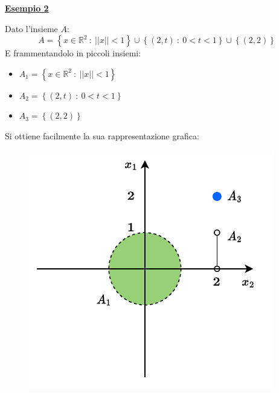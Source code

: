 \documentclass[a4paper]{article}
\newcommand{\example}[1]{\textcolor{Green4}{\textbf{#1}}}
\begin{document}
	\begin{flushleft}
		\example{\underline{Esempio 2}}
	\end{flushleft}

	\noindent
	Dato l'insieme $A$:
	\begin{equation*}
		A = \left\{x \in \mathbb{R}^{2} \: : \: ||x|| < 1 \right\} 
		\cup 
		\left\{\left(2,t\right) \: : \: 0 < t < 1\right\} 
		\cup 
		\left\{\left(2,2\right)\right\}
	\end{equation*}
	E frammentandolo in piccoli insiemi:
	\begin{itemize}
		\item $A_{1} = \left\{x \in \mathbb{R}^{2} \: : \: ||x|| < 1 \right\} $
		
		\item $A_{2} = \left\{\left(2,t\right) \: : \: 0 < t < 1\right\} $

		\item $A_{3} = \left\{\left(2,2\right)\right\} $
	\end{itemize}
	Si ottiene facilmente la sua rappresentazione grafica:
	\begin{figure}[!htp]
		\centering
		\includegraphics[width=.7\textwidth]{img/insiemi_aperti-chiusi-2.pdf}
	\end{figure}
\end{document}
